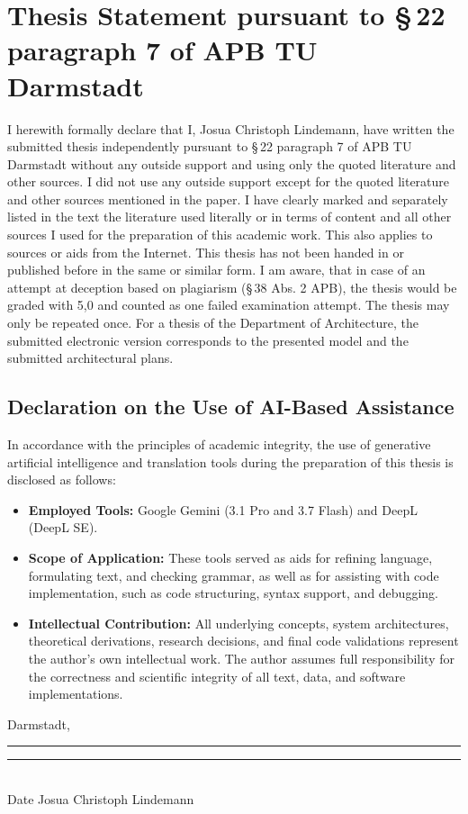 \section*{Thesis Statement pursuant to \S\,22 paragraph 7 of APB TU Darmstadt}
\thispagestyle{empty}

I herewith formally declare that I, Josua Christoph Lindemann, have written the submitted 
thesis independently pursuant to \S\,22 paragraph 7 of APB TU Darmstadt without any outside 
support and using only the quoted literature and other sources. I did not use any outside 
support except for the quoted literature and other sources mentioned in the paper. 
I have clearly marked and separately listed in the text the literature used literally 
or in terms of content and all other sources I used for the preparation of this academic work. 
This also applies to sources or aids from the Internet.
This thesis has not been handed in or published before in the same or similar form.
I am aware, that in case of an attempt at deception based on plagiarism (\S\,38 Abs. 2 APB), 
the thesis would be graded with 5,0 and counted as one failed examination attempt. 
The thesis may only be repeated once.
For a thesis of the Department of Architecture, the submitted electronic version corresponds 
to the presented model and the submitted architectural plans.


\vspace{1.5em}

\subsection*{Declaration on the Use of AI-Based Assistance}

In accordance with the principles of academic integrity, the use of generative artificial intelligence 
and translation tools during the preparation of this thesis is disclosed as follows:

\begin{itemize}
    \item \textbf{Employed Tools:} 
        Google Gemini (3.1 Pro and 3.7 Flash) and DeepL (DeepL SE).
    \item \textbf{Scope of Application:}
        These tools served as aids for refining language, formulating text, and checking grammar,
        as well as for assisting with code implementation, such as code structuring, syntax support, 
        and debugging.
    \item \textbf{Intellectual Contribution:} 
        All underlying concepts, system architectures, theoretical derivations, research decisions, and 
        final code validations represent the author's own intellectual work. 
        The author assumes full responsibility for the correctness and scientific integrity of all text, 
        data, and software implementations.
\end{itemize}

\vspace{2.5em}

\noindent
Darmstadt, \rule{4cm}{0.4pt} \hfill \rule{6cm}{0.4pt}\\
\phantom{Darmstadt, }Date \hfill Josua Christoph Lindemann